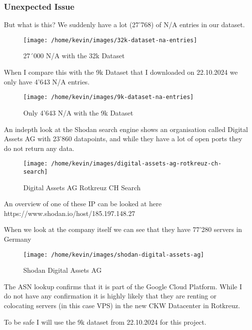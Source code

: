 \documentclass[11pt,a4paper]{article}
\begin{document}
\begin{data}
\newpage
\subsubsection{Unexpected Issue}
But what is this? We suddenly have a lot  (27'768) of N/A entries in our dataset.

\begin{figure}[h!]
    \centering
    \texttt{[image: /home/kevin/images/32k-dataset-na-entries]}
    \caption{27´000 N/A with the 32k Dataset}
    \label{fig:32k-dataset-na-entries}
\end{figure}

When I compare this with the 9k Dataset that I downloaded on 22.10.2024 we only have 4'643 N/A entries.

\begin{figure}[h!]
    \centering
    \texttt{[image: /home/kevin/images/9k-dataset-na-entries]}
    \caption{Only 4'643 N/A with the 9k Dataset}
    \label{fig:9k-dataset-na-entries}
\end{figure}

\newpage

An indepth look at the Shodan search engine shows an organisation called Digital Assets AG with 23'860 datapoints, and
while they have a lot of open ports they do not return any data.

\begin{figure}[h!]
    \centering
    \texttt{[image: /home/kevin/images/digital-assets-ag-rotkreuz-ch-search]}
    \caption{Digital Assets AG Rotkreuz CH Search}
    \label{fig:digital-assets-ag-rotkreuz-ch-search}
\end{figure}

An overview of one of these IP can be looked at here https://www.shodan.io/host/185.197.148.27


When we look at the company itself we can see that they have 77'280 servers in Germany

\begin{figure}[h!]
    \centering
    \texttt{[image: /home/kevin/images/shodan-digital-assets-ag]}
    \caption{Shodan Digital Assets AG}
    \label{fig:shodan-digital-assets-ag}
\end{figure}

The ASN lookup confirms that it is part of the Google Cloud Platform. While I do not have any confirmation it is highly likely that
they are renting or colocating servers (in this case VPS) in the new CKW Datacenter in Rotkreuz.

To be safe I will use the 9k dataset from 22.10.2024 for this project.

\end{data}
\newpage
\end{document}
